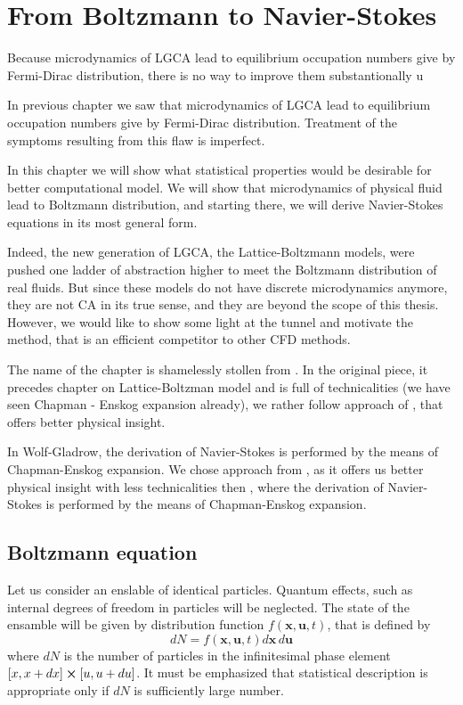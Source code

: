 \chapter{From Boltzmann to Navier-Stokes}

Because microdynamics of LGCA lead to equilibrium occupation numbers give by Fermi-Dirac distribution, there is no way to improve them substantionally u

In previous chapter we saw that microdynamics of LGCA lead to equilibrium occupation numbers give by Fermi-Dirac distribution.
Treatment of the symptoms resulting from this flaw is imperfect.

In this chapter we will show what statistical properties would be desirable for better computational model.
We will show that microdynamics of physical fluid lead to Boltzmann distribution, and starting there, we will derive Navier-Stokes equations in its most general form.
 
Indeed, the new generation of LGCA, the Lattice-Boltzmann models, were pushed one ladder of abstraction higher to meet the Boltzmann distribution of real fluids.
But since these models do not have discrete microdynamics anymore, they are not CA in its true sense, and they are beyond the scope of this thesis.
However, we would like to show some light at the tunnel and motivate the method, that is an efficient competitor to other CFD methods.

\bigskip
The name of the chapter is shamelessly stollen from \cite{wolf}. In the original piece, it precedes chapter on Lattice-Boltzman model and is full of technicalities (we have seen Chapman - Enskog expansion already), we rather follow approach of \cite{astro}, that offers better physical insight.

In Wolf-Gladrow, the derivation of Navier-Stokes is performed by the means of Chapman-Enskog expansion.
We chose approach from \cite{astro}, as it offers us better physical insight with less technicalities then \cite{wolf}, where the derivation of Navier-Stokes is performed by the means of Chapman-Enskog expansion.

\section{Boltzmann equation}

Let us consider an enslable of identical particles. Quantum effects, such as internal degrees of freedom in particles will be neglected. The state of the ensamble will be given by distribution function $f(\bm{x}, \bm{u}, t)$, that is defined by
\begin{equation} \label{hust}
dN = f(\bm{x}, \bm{u}, t) d\bm{x} \, d\bm{u}
\end{equation} 
where $dN$ is the number of particles in the infinitesimal phase element $[x, x+ dx] \cross [u, u +du]$.
It must be emphasized that statistical description is appropriate only if $dN$ is sufficiently large number.

